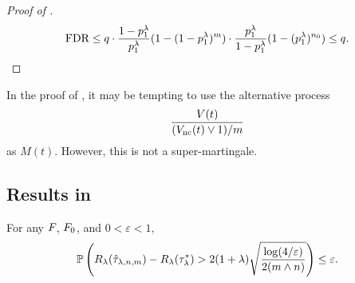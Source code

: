 \begin{proof}[Proof of ]
    \begin{align*}
        \text{FDR}
        \le q \cdot \frac{1-p_1^\lambda}{p_1^\lambda} (1 - (1 - p_1^\lambda)^{m}) \cdot \frac{p_1^\lambda}{1-p_1^\lambda} (1 - (p_1^\lambda)^{{n_0}})
        \le q.
    \end{align*}

\end{proof}

\begin{remark}
In the proof of , it may be tempting to use the alternative process
\[
  \frac{{V}(t)}{({V_{\text{nc}}}(t) \vee 1)/m}
\]
as $M(t)$. However, this is not a super-martingale.
\end{remark}

\subsection{Results in
  }\label{sec:results-localFDR}

\begin{proposition}\label{prop:convergence.rate.weak}
For any ${F_{}}$, ${F_{0}}$, and $0 < \varepsilon < 1$,
\begin{align*}
    \mathbb{P}\left({R_{\lambda}}({\hat{\tau}_{\lambda, {n}, m}}) - {R_{\lambda}}({\tau^*_\lambda}) > 2(1+\lambda)\sqrt{\frac{\log(4/\varepsilon)}{2 (m \wedge {n})}} \right)
    \le \varepsilon.
\end{align*}
\end{proposition}

